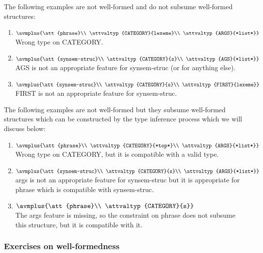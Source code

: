 \documentclass[12pt]{report}
\begin{document}
The following examples are not well-formed and do not
subsume well-formed structures:
\begin{enumerate}
\item
{\tiny $\avmplus{\att{phrase}\\
\attvaltyp{CATEGORY}{lexeme}\\
\attvaltyp{ARGS}{*list*}}$}\\
Wrong type on CATEGORY.
\item
{\tiny $\avmplus{\att{synsem-struc}\\
\attvaltyp{CATEGORY}{s}\\
\attvaltyp{AGS}{*list*}}$}\\
AGS is not an appropriate feature for
{\type synsem-struc} (or for anything else).
\item 
{\tiny $\avmplus{\att{synsem-struc}\\
\attvaltyp{CATEGORY}{s}\\
\attvaltyp{FIRST}{lexeme}}$}\\
FIRST is not an appropriate feature
for {\type synsem-struc}.
\end{enumerate}


The following examples are not well-formed but they
subsume well-formed structures which can be constructed
by the type inference process 
which we will discuss below:
\begin{enumerate}
\item
{\tiny $\avmplus{\att{phrase}\\
\attvaltyp{CATEGORY}{*top*}\\
\attvaltyp{ARGS}{*list*}}$}\\
Wrong type on CATEGORY, but it is compatible with
a valid type.
\item
{\tiny $\avmplus{\att{synsem-struc}\\
\attvaltyp{CATEGORY}{s}\\
\attvaltyp{ARGS}{*list*}}$}\\
{\feature args} is not an appropriate feature for
{\type synsem-struc} but it is appropriate
for {\type phrase} which is compatible with
{\type synsem-struc}.
\item
{\tiny $\avmplus{\att{phrase}\\
\attvaltyp{CATEGORY}{s}}$}\\
The {\feature args} feature is missing,
so the constraint on {\type phrase} does not
subsume this structure, but it is compatible with it.
\end{enumerate}

\subsubsection{Exercises on well-formedness}
\end{document}
